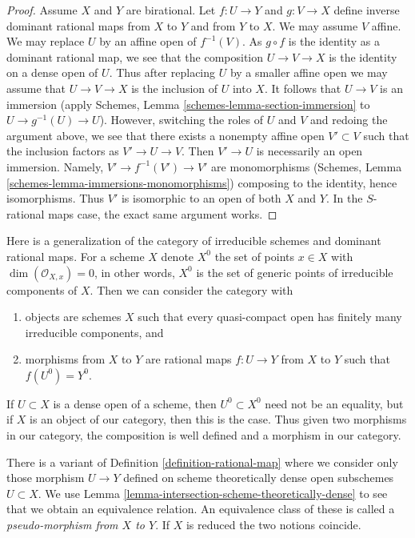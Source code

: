 \begin{proof}
Assume $X$ and $Y$ are birational. Let $f : U \to Y$ and $g : V \to X$
define inverse dominant rational maps from $X$ to $Y$ and from $Y$ to $X$.
We may assume $V$ affine. We may replace $U$ by an affine open of $f^{-1}(V)$.
As $g \circ f$ is the identity as a dominant rational map, we see that
the composition $U \to V \to X$ is the identity on a dense open of $U$.
Thus after replacing $U$ by a smaller affine open we may assume that
$U \to V \to X$ is the inclusion of $U$ into $X$. It follows that
$U \to V$ is an immersion
(apply Schemes, Lemma \ref{schemes-lemma-section-immersion}
to $U \to g^{-1}(U) \to U$).
However, switching the roles of $U$ and $V$ and redoing the argument
above, we see that there exists a nonempty affine open $V' \subset V$
such that the inclusion factors as $V' \to U \to V$. Then $V' \to U$ is
necessarily an open immersion. Namely, $V' \to f^{-1}(V') \to V'$ are
monomorphisms
(Schemes, Lemma \ref{schemes-lemma-immersions-monomorphisms})
composing to the identity, hence isomorphisms.
Thus $V'$ is isomorphic to an open of both $X$ and $Y$.
In the $S$-rational maps case, the exact same argument works.
\end{proof}

\begin{remark}
\label{remark-generalize-category}
Here is a generalization of the category of irreducible schemes and
dominant rational maps. For a scheme $X$ denote $X^0$ the set of
points $x \in X$ with $\dim(\mathcal{O}_{X, x}) = 0$, in other words,
$X^0$ is the set of generic points of irreducible components of $X$.
Then we can consider the category with
\begin{enumerate}
\item objects are schemes $X$ such that every quasi-compact open has
finitely many irreducible components, and
\item morphisms from $X$ to $Y$ are rational maps $f : U \to Y$
from $X$ to $Y$ such that $f(U^0) = Y^0$.
\end{enumerate}
If $U \subset X$ is a dense open of a scheme, then
$U^0 \subset X^0$ need not be an equality, but if $X$ is an
object of our category, then this is the case.
Thus given two morphisms in our category, the composition
is well defined and a morphism in our category.
\end{remark}

\begin{remark}
\label{remark-pseudo-morphisms}
There is a variant of Definition \ref{definition-rational-map}
where we consider only those morphism $U \to Y$ defined on
scheme theoretically dense open subschemes $U \subset X$.
We use Lemma \ref{lemma-intersection-scheme-theoretically-dense}
to see that we obtain an equivalence relation.
An equivalence class of these is called a
{\it pseudo-morphism from $X$ to $Y$}.
If $X$ is reduced the two notions coincide.
\end{remark}






